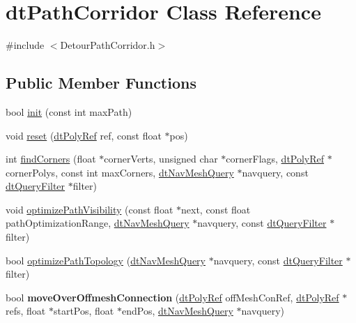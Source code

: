 \hypertarget{classdtPathCorridor}{}\section{dt\+Path\+Corridor Class Reference}
\label{classdtPathCorridor}


{\ttfamily \#include $<$Detour\+Path\+Corridor.\+h$>$}

\subsection*{Public Member Functions}
\begin{DoxyCompactItemize}
\item 
bool \hyperlink{classdtPathCorridor_a85b4c98157b68a57b9c3302f45d0ed7f}{init} (const int max\+Path)
\item 
void \hyperlink{classdtPathCorridor_abe057e7b5e1d6677e3d9eadb558df2b0}{reset} (\hyperlink{group__detour_gab4e0b2257a670c1a800057999612b466}{dt\+Poly\+Ref} ref, const float $\ast$pos)
\item 
int \hyperlink{classdtPathCorridor_aa1076957ddf987a274a756fbf8202cab}{find\+Corners} (float $\ast$corner\+Verts, unsigned char $\ast$corner\+Flags, \hyperlink{group__detour_gab4e0b2257a670c1a800057999612b466}{dt\+Poly\+Ref} $\ast$corner\+Polys, const int max\+Corners, \hyperlink{classdtNavMeshQuery}{dt\+Nav\+Mesh\+Query} $\ast$navquery, const \hyperlink{classdtQueryFilter}{dt\+Query\+Filter} $\ast$filter)
\item 
void \hyperlink{classdtPathCorridor_a3970b6cd229731debe6beb41d9885463}{optimize\+Path\+Visibility} (const float $\ast$next, const float path\+Optimization\+Range, \hyperlink{classdtNavMeshQuery}{dt\+Nav\+Mesh\+Query} $\ast$navquery, const \hyperlink{classdtQueryFilter}{dt\+Query\+Filter} $\ast$filter)
\item 
bool \hyperlink{classdtPathCorridor_a69288d28ab5d23b2c2654e45c5a33c25}{optimize\+Path\+Topology} (\hyperlink{classdtNavMeshQuery}{dt\+Nav\+Mesh\+Query} $\ast$navquery, const \hyperlink{classdtQueryFilter}{dt\+Query\+Filter} $\ast$filter)
\item 
\mbox{\label{classdtPathCorridor_ae44344d2404b1d06f74c15f6748ad48d}} 
bool {\bfseries move\+Over\+Offmesh\+Connection} (\hyperlink{group__detour_gab4e0b2257a670c1a800057999612b466}{dt\+Poly\+Ref} off\+Mesh\+Con\+Ref, \hyperlink{group__detour_gab4e0b2257a670c1a800057999612b466}{dt\+Poly\+Ref} $\ast$refs, float $\ast$start\+Pos, float $\ast$end\+Pos, \hyperlink{classdtNavMeshQuery}{dt\+Nav\+Mesh\+Query} $\ast$navquery)

\end{DoxyCompactItemize}
